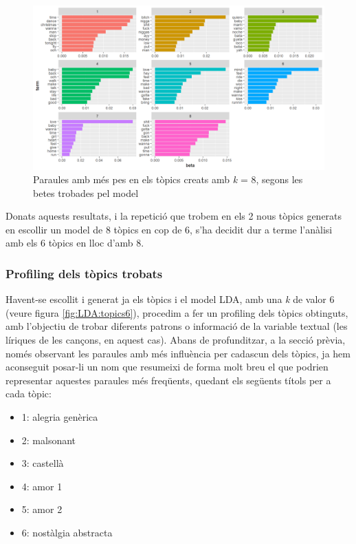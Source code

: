 \begin{figure}[H]
    \centering
    \includegraphics[width=0.8\linewidth]{Images/8_Textual/LDA/lda_topics8.png}
    \caption{Paraules amb més pes en els tòpics creats amb \textit{k} = 8, segons les betes trobades pel model}
    \label{fig:LDA:topics8}
\end{figure}

Donats aquests resultats, i la repetició que trobem en els 2 nous tòpics generats en escollir un model de 8 tòpics en cop de 6, s'ha decidit dur a terme l'anàlisi amb els 6 tòpics en lloc d'amb 8.

\subsubsection{Profiling dels tòpics trobats}

Havent-se escollit i generat ja els tòpics i el model LDA, amb una \textit{k} de valor 6 (veure figura \ref{fig:LDA:topics6}), procedim a fer un profiling dels tòpics obtinguts, amb l'objectiu de trobar diferents patrons o informació de la variable textual (les líriques de les cançons, en aquest cas). Abans de profunditzar, a la secció prèvia, només observant les paraules amb més influència per cadascun dels tòpics, ja hem aconseguit posar-li un nom que resumeixi de forma molt breu el que podrien representar aquestes paraules més freqüents, quedant els següents títols per a cada tòpic:

\begin{itemize}
    \item 1: alegria genèrica
    \item 2: malsonant
    \item 3: castellà
    \item 4: amor 1
    \item 5: amor 2
    \item 6: nostàlgia abstracta
\end{itemize}

